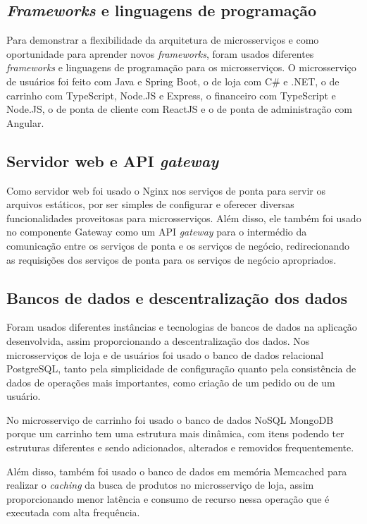 \subsection{\emph{Frameworks} e linguagens de programação}
Para demonstrar a flexibilidade da arquitetura de microsserviços e como oportunidade para aprender novos \emph{frameworks}, foram usados diferentes \emph{frameworks} e linguagens de programação para os microsserviços. O microsserviço de usuários foi feito com Java e Spring Boot, o de loja com C\# e .NET, o de carrinho com TypeScript, Node.JS e Express, o financeiro com TypeScript e Node.JS, o de ponta de cliente com ReactJS e o de ponta de administração com Angular.

\subsection{Servidor web e API \emph{gateway}}
Como servidor web foi usado o Nginx nos serviços de ponta para servir os arquivos estáticos, por ser simples de configurar e oferecer diversas funcionalidades proveitosas para microsserviços. Além disso, ele também foi usado no componente Gateway como um API \emph{gateway} para o intermédio da comunicação entre os serviços de ponta e os serviços de negócio, redirecionando as requisições dos serviços de ponta para os serviços de negócio apropriados.

\subsection{Bancos de dados e descentralização dos dados}
Foram usados diferentes instâncias e tecnologias de bancos de dados na aplicação desenvolvida, assim proporcionando a descentralização dos dados. Nos microsserviços de loja e de usuários foi usado o banco de dados relacional PostgreSQL, tanto pela simplicidade de configuração quanto pela consistência de dados de operações mais importantes, como criação de um pedido ou de um usuário.

No microsserviço de carrinho foi usado o banco de dados NoSQL MongoDB porque um carrinho tem uma estrutura mais dinâmica, com itens podendo ter estruturas diferentes e sendo adicionados, alterados e removidos frequentemente.

Além disso, também foi usado o banco de dados em memória Memcached para realizar o \emph{caching} da busca de produtos no microsserviço de loja, assim proporcionando menor latência e consumo de recurso nessa operação que é executada com alta frequência.

